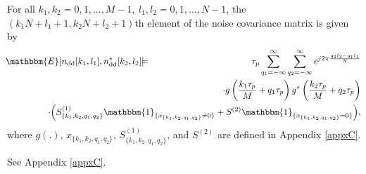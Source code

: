 \begin{theorem}
For all $k_1,k_2=0,1,...,M-1, \ l_1,l_2=0,1,...,N-1$, the $(k_{1}N+l_1+1,k_{2}N+l_{2}+1)$th element of the noise covariance matrix is given by
\begin{eqnarray}
\hspace{-1mm}
\mathbbm{E}[n_{\mathrm{dd}}[k_1,l_1],n_{\mathrm{dd}}^{*}[k_2,l_2]] & \hspace{-2mm} = & \hspace{-2mm} \tau_p\sum_{q_1=-\infty}^{\infty}\sum_{q_2=-\infty}^{\infty}e^{j2\pi\frac{q_2l_2-q_1l_1}{N}} \nonumber \\
& \hspace{-53mm} & \hspace{-43mm} \cdot g\left(\frac{k_1\tau_p}{M}+q_1\tau_p\right)g^{*}\left(\frac{k_2\tau_p} {M}+q_2\tau_p\right) \nonumber \\
& \hspace{-53mm} & \hspace{-43mm} 
\cdot \Big(S_{\{k_1,k_2,q_1,q_2\}}^{(1)}\mathbbm{1}_{\{x_{\{k_1,k_2,q_1,q_2\}}\neq 0\}} 
+S^{(2)}\mathbbm{1}_{\{x_{\{k_1,k_2,q_1,q_2\}}= 0\}} \Big), \nonumber \\
\label{eqn:noise_expectation}
\end{eqnarray}
where $g(.)$, $x_{\{k_1,k_2,q_1,q_2\}}$, 
$S^{(1)}_{\{k_1,k_2,q_1,q_2\}}$, and $S^{(2)}$ are defined in Appendix \ref{appxC}.
\label{Thm2}
\end{theorem}
\vspace{-1mm}
\begin{IEEEproof}
See Appendix \ref{appxC}.
\end{IEEEproof}




